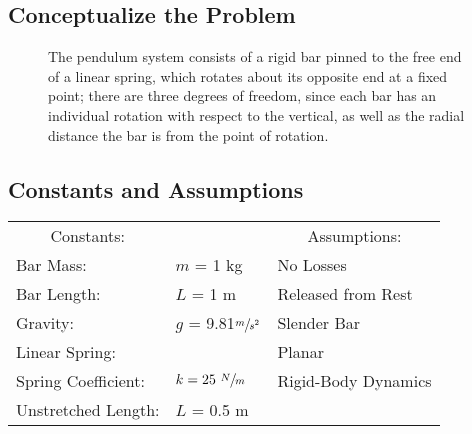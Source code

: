 \documentclass[12pt]{report}
\begin{document}

{\tableofcontents\let\clearpage\relax\listoffigures}
\clearpage
{}
\newpage
\begin{flushleft}

\section{Conceptualize the Problem}


\begin{figure}[h]
  \begin{minipage}[c]{.4\textwidth}
  
\end{minipage}%
\begin{minipage}[c]{.6\textwidth}
  The pendulum system consists of a rigid bar pinned to the free end of a linear spring,
  which rotates about its opposite end at a fixed point; there are three degrees of freedom,
  since each bar has an individual rotation with respect to the vertical, as well as the
  radial distance the bar is from the point of rotation.
\end{minipage}
\end{figure}

\subsection{Constants and Assumptions}
\begin{tabular}{ll@{\hskip .75in}l}
 \multicolumn{1}{c}{Constants:} && \multicolumn{1}{c}{Assumptions:} \\
 Bar Mass: &$m$ = 1 kg & No Losses\\
 Bar Length: &$L$ = 1 m & Released from Rest\\
 Gravity: &$g$ = 9.81$\sfrac{m}{s^2}$ &Slender Bar \\
 Linear Spring: &&Planar\\
 \quad Spring Coefficient:& $k = 25~\sfrac{N}{m}$ &Rigid-Body Dynamics \\
 \quad Unstretched Length:& $L$ = 0.5 m \\
\end{tabular}
\vspace{5ex}


\end{flushleft}
\end{document}
